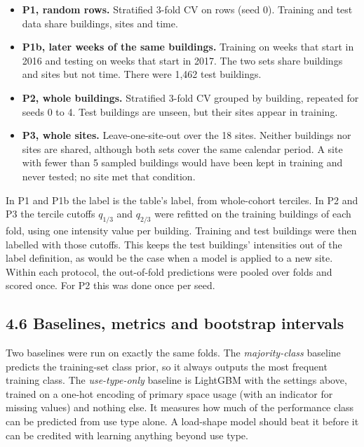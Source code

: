 \documentclass[
  10pt,
]{article}
\providecommand{\tightlist}{%
  \setlength{\itemsep}{0pt}\setlength{\parskip}{0pt}}
\begin{document}
\begin{itemize}
\tightlist
\item
  \textbf{P1, random rows.} Stratified 3-fold CV on rows (seed 0).
  Training and test data share buildings, sites and time.
\item
  \textbf{P1b, later weeks of the same buildings.} Training on weeks
  that start in 2016 and testing on weeks that start in 2017. The two
  sets share buildings and sites but not time. There were 1,462 test
  buildings.
\item
  \textbf{P2, whole buildings.} Stratified 3-fold CV grouped by
  building, repeated for seeds 0 to 4. Test buildings are unseen, but
  their sites appear in training.
\item
  \textbf{P3, whole sites.} Leave-one-site-out over the 18 sites.
  Neither buildings nor sites are shared, although both sets cover the
  same calendar period. A site with fewer than 5 sampled buildings would
  have been kept in training and never tested; no site met that
  condition.
\end{itemize}

In P1 and P1b the label is the table's label, from whole-cohort
terciles. In P2 and P3 the tercile cutoffs \(q_{1/3}\) and \(q_{2/3}\)
were refitted on the training buildings of each fold, using one
intensity value per building. Training and test buildings were then
labelled with those cutoffs. This keeps the test buildings' intensities
out of the label definition, as would be the case when a model is
applied to a new site. Within each protocol, the out-of-fold predictions
were pooled over folds and scored once. For P2 this was done once per
seed.

\hypertarget{baselines-metrics-and-bootstrap-intervals}{%
\subsection{4.6 Baselines, metrics and bootstrap
intervals}\label{baselines-metrics-and-bootstrap-intervals}}

Two baselines were run on exactly the same folds. The
\emph{majority-class} baseline predicts the training-set class prior, so
it always outputs the most frequent training class. The
\emph{use-type-only} baseline is LightGBM with the settings above,
trained on a one-hot encoding of primary space usage (with an indicator
for missing values) and nothing else. It measures how much of the
performance class can be predicted from use type alone. A load-shape
model should beat it before it can be credited with learning anything
beyond use type.
\end{document}
